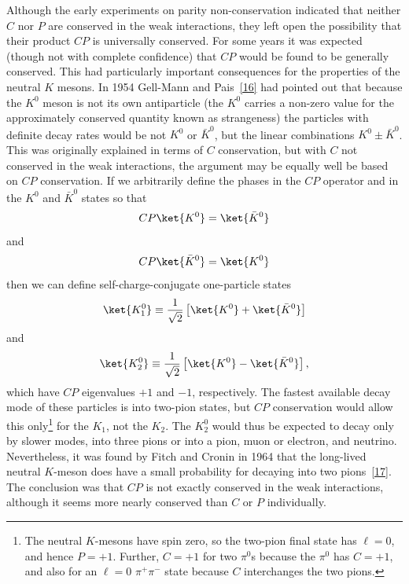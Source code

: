 Although the early experiments on parity non-conservation indicated that neither
$C$ nor $P$ are conserved in the weak interactions, they left open the possibility
that their product $CP$ is universally conserved. For some years it was expected
(though not with complete confidence) that $CP$ would be found to be generally
conserved. This had particularly important consequences for the properties of the
neutral $K$ mesons. In 1954 Gell-Mann and Pais~\hyperref[ref:3.16]{[16]} had pointed out that because the
$K^0$ meson is not its own antiparticle (the $K^0$ carries a non-zero value for the
approximately conserved quantity known as strangeness) the particles with definite
decay rates would be not $K^0$ or $\bar K^0$, but the linear combinations
$K^0\pm\bar K^0$. This was originally explained in terms of $C$ conservation, but
with $C$ not conserved in the weak interactions, the argument may be equally well
be based on $CP$ conservation. If we arbitrarily define the phases in the $CP$
operator and in the $K^0$ and $\bar K^0$ states so that
\[
CP\ket{K^0}=\ket{\bar K^0}
\]
and
\[
CP\ket{\bar K^0}=\ket{K^0}
\]
then we can define self-charge-conjugate one-particle states
\[
\ket{K_1^0}\equiv\frac{1}{\sqrt2}\left[\ket{K^0}+\ket{\bar K^0}\right]
\]
and
\[
\ket{K_2^0}\equiv\frac{1}{\sqrt2}\left[\ket{K^0}-\ket{\bar K^0}\right],
\]
which have $CP$ eigenvalues $+1$ and $-1$, respectively. The fastest available
decay mode of these particles is into two-pion states, but $CP$ conservation would
allow this only\footnote{The neutral $K$-mesons have spin zero, so the two-pion final
state has $\ell=0$, and hence $P=+1$. Further, $C=+1$ for two $\pi^0$s because the
$\pi^0$ has $C=+1$, and also for an $\ell=0$ $\pi^+\pi^-$ state because $C$
interchanges the two pions.} for the $K_1$, not the $K_2$. The $K_2^0$ would thus
be expected to decay only by slower modes, into three pions or into a pion, muon or
electron, and neutrino. Nevertheless, it was found by Fitch and Cronin in 1964 that
the long-lived neutral $K$-meson does have a small probability for decaying into
two pions~\hyperref[ref:3.17]{[17]}. The conclusion was that $CP$ is not exactly conserved in the weak
interactions, although it seems more nearly conserved than $C$ or $P$ individually.

